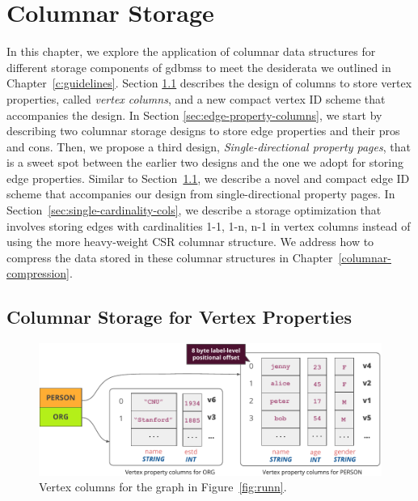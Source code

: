 \chapter{Columnar Storage}
\label{c:columnar-storage}

In this chapter, we explore the application of columnar data structures for different storage components of  \gls{gdbms}s to meet the desiderata we outlined in Chapter~\ref{c:guidelines}. Section \ref{sec:vertex-property-columns} describes the design of columns to store vertex properties, called \emph{vertex columns}, and a new compact vertex ID scheme that accompanies the design. In Section \ref{sec:edge-property-columns}, we start by describing two columnar storage designs to store edge properties and their pros and cons. Then, we propose a third design, \emph{Single-directional property pages}, that is a sweet spot between the earlier two designs and the one we adopt for storing edge properties. Similar to Section~\ref{sec:vertex-property-columns}, we describe a novel and compact edge ID scheme that accompanies our design from single-directional property pages. In Section~\ref{sec:single-cardinality-cols}, we describe a storage optimization that involves storing edges with cardinalities 1-1, 1-n, n-1 in vertex columns instead of using the more heavy-weight CSR columnar structure. We address how to compress the data stored in these columnar structures in Chapter~\ref{columnar-compression}.

\section{Columnar Storage for Vertex Properties}
\label{sec:vertex-property-columns}

\begin{figure}
	\hfill\includegraphics[scale=0.85]{img/vpcols}\hspace*{\fill}
	\caption{Vertex columns for the graph in Figure~\ref{fig:runn}.}
	\label{fig:vpcols}
\end{figure}

